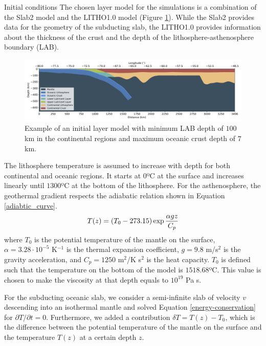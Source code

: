 \documentclass[final]{beamer}
\newlength{\colwidth}
\begin{document}
\begin{frame}[t]
\begin{columns}[t]
\begin{column}{\colwidth}
\begin{block}{Initial conditions}
  \heading{\textcolor{darkblue}{Layer model}}
    The chosen layer model for the simulations is a combination of the Slab2 model \cite{hayes2018slab2} and the LITHO1.0 model \cite{pasyanos2014litho1} (Figure \ref{fig:interfaces}). While the Slab2 provides data for the geometry of the subducting slab, the LITHO1.0 provides information about the thickness of the crust and the depth of the lithosphere-asthenosphere boundary (LAB). 
    \begin{figure}
      \centering
      \includegraphics[width=0.22\paperwidth]{figures/interfaces.png}
      \caption{Example of an initial layer model with minimum LAB depth of $100$ km in the continental regions and maximum oceanic crust depth of $7$ km.}
      \label{fig:interfaces}
    \end{figure}
  \heading{\textcolor{darkblue}{Thermal structure}}
    The lithosphere temperature is assumed to increase with depth for both continental and oceanic regions. It starts at $0$ºC at the surface and increases linearly until $1300$ºC at the bottom of the lithosphere. For the asthenosphere, the geothermal gradient respects the adiabatic relation shown in Equation \ref{adiabtic_curve}.
    \begin{equation}{\label{adiabtic_curve}}
      T(z)=(T_0-273.15)\exp{\frac{\alpha g z}{C_p}}
    \end{equation}
   \noindent where $T_0$ is the potential temperature of the mantle on the surface, $\alpha=3.28\cdot 10^{-5}$ K$^{-1}$ is the thermal expansion coefficient, $g=9.8$ m/s$^2$ is the gravity acceleration, and $C_p=1250$ m$^2$/K s$^2$ is the heat capacity. $T_0$ is defined such that the temperature on the bottom of the model is $1518.68$ºC. This value is chosen to make the viscosity at that depth equals to $10^{19}$ Pa s.
    
   For the subducting oceanic slab, we consider a semi-infinite slab of velocity $v$ descending into an isothermal mantle and solved Equation \ref{energy-conservation} for $\partial T/\partial t=0$. Furthermore, we added a contribution $\delta T = T(z)-T_0$, which is the difference between the potential temperature of the mantle on the surface and the temperature $T(z)$ at a certain depth $z$.
   

\end{block}
\end{column}
\end{columns}
\end{frame}
\end{document}
